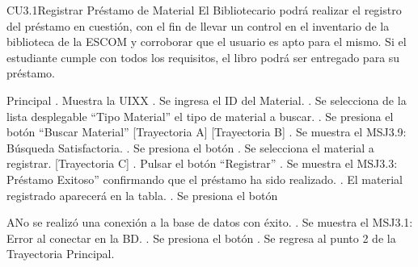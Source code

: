 
	\begin{UseCase}{CU3.1}{Registrar Préstamo de Material}{
		El Bibliotecario podrá realizar el registro del préstamo en cuestión, con el fin de llevar un control en el inventario de la biblioteca de la ESCOM y corroborar que el usuario es apto para el mismo. Si el estudiante cumple con todos los requisitos, el libro podrá ser entregado para su préstamo.
	}
	\end{UseCase}
	\begin{UCtrayectoria}{Principal}
		.	Muestra la UIXX
		.	Se ingresa el ID del Material.
		.	Se selecciona de la lista desplegable “Tipo Material” el tipo de material a buscar.
		.	Se presiona el botón “Buscar Material” [Trayectoria A] [Trayectoria B] 
		.	Se muestra el MSJ3.9: Búsqueda Satisfactoria.
		. Se presiona el botón 
		.	Se selecciona el material a registrar. [Trayectoria C]
		.	Pulsar el botón “Registrar”
		.	Se muestra el MSJ3.3: Préstamo Exitoso” confirmando que el préstamo ha sido realizado.
		.	El material registrado aparecerá en la tabla.
		. Se presiona el botón 
	\end{UCtrayectoria}



		\begin{UCtrayectoriaA}{A}{No se realizó una conexión a la base de datos con éxito.}
			.	Se muestra el MSJ3.1: Error al conectar en la BD. 
			. Se presiona el botón 
			.	Se regresa al punto 2 de la Trayectoria Principal.
		\end{UCtrayectoriaA}

